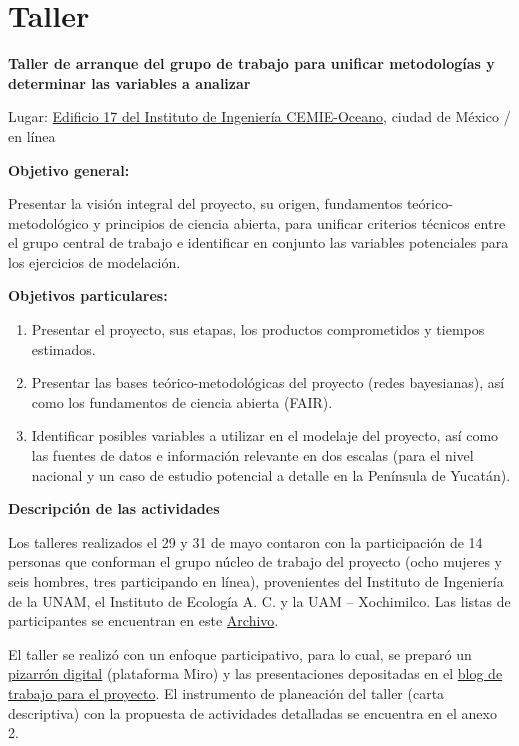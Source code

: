 \documentclass[
  letterpaper,
  DIV=11,
  numbers=noendperiod]{scrreprt}
\begin{document}
\chapter{Taller}\label{taller}

\textbf{Taller de arranque del grupo de trabajo para unificar
metodologías y determinar las variables a analizar}

Lugar: \href{https://maps.app.goo.gl/hCVkgx3S4XdrRimm7}{Edificio 17 del
Instituto de Ingeniería CEMIE-Oceano}, ciudad de México / en línea

\textbf{Objetivo general:}

Presentar la visión integral del proyecto, su origen, fundamentos
teórico-metodológico y principios de ciencia abierta, para unificar
criterios técnicos entre el grupo central de trabajo e identificar en
conjunto las variables potenciales para los ejercicios de modelación.

\textbf{Objetivos particulares:}

\begin{enumerate}
\def\labelenumi{\arabic{enumi}.}
\item
  Presentar el proyecto, sus etapas, los productos comprometidos y
  tiempos estimados.
\item
  Presentar las bases teórico-metodológicas del proyecto (redes
  bayesianas), así como los fundamentos de ciencia abierta (FAIR).
\item
  Identificar posibles variables a utilizar en el modelaje del proyecto,
  así como las fuentes de datos e información relevante en dos escalas
  (para el nivel nacional y un caso de estudio potencial a detalle en la
  Península de Yucatán).
\end{enumerate}

\textbf{Descripción de las actividades}

Los talleres realizados el 29 y 31 de mayo contaron con la participación
de 14 personas que conforman el grupo núcleo de trabajo del proyecto
(ocho mujeres y seis hombres, tres participando en línea), provenientes
del Instituto de Ingeniería de la UNAM, el Instituto de Ecología A. C. y
la UAM -- Xochimilco. Las listas de participantes se encuentran en este
\href{Taller/Anexo\%201\%20Lista\%20de\%20participantes.pdf}{Archivo}.

El taller se realizó con un enfoque participativo, para lo cual, se
preparó un
\href{https://miro.com/welcomeonboard/ckhlZ3lXY1djM0FXd3ZIZmlpV3FUVXFONGJsUFJ0NGFIaWw0eGdHOHBDalhDdFk1Zjg1MUVOZTNMUmZaNDhPVHwzMDc0NDU3MzUyMDM4MTIwMjcwfDI=?share_link_id=865983900620}{pizarrón
digital} (plataforma Miro) y las presentaciones depositadas en el
\href{https://sw-costas-arenosas.netlify.app/presentaciones\#category=presentaci\%C3\%B3n}{blog
de trabajo para el proyecto}. El instrumento de planeación del taller
(carta descriptiva) con la propuesta de actividades detalladas se
encuentra en el anexo 2.
\end{document}
